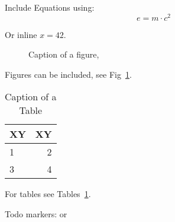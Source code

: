 \documentclass{expose} %
\begin{document}
Include Equations using:
\[ e = m \cdot c^2 \]

Or inline $x=42$.

\begin{figure}[tbh!]
\centering
\caption{Caption of a figure, }
\label{pic::example1}
\end{figure}
Figures can be included, see Fig~\ref{pic::example1}.


\begin{table}[h]
\centering
\caption{Caption of a Table}
\label{tbl::example1}
\begin{tabular}{lr}
\toprule
\textbf{XY}  & \textbf{XY} \\
\midrule
1   & 2 \\
\midrule
3 & 4 \\
\bottomrule
\end{tabular}
\end{table}

For tables see Tables~\ref{tbl::example1}.

Todo markers: 
or 


\cite[p.12]{Berlin}

\printbibliography

\clearpage

\end{document}
